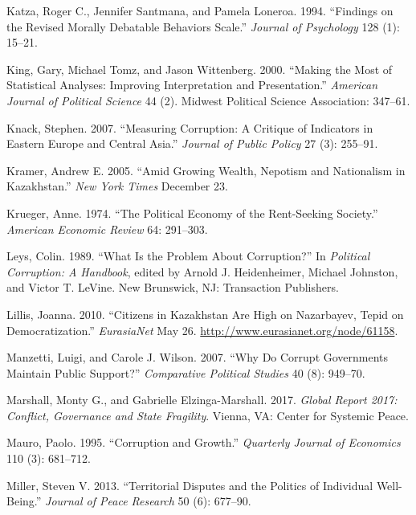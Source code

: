 \documentclass[11pt,]{article}
\begin{document}
\hypertarget{ref-katzaetal1994frmd}{}
Katza, Roger C., Jennifer Santmana, and Pamela Loneroa. 1994. ``Findings
on the Revised Morally Debatable Behaviors Scale.'' \emph{Journal of
Psychology} 128 (1): 15--21.

\hypertarget{ref-kingetal2000mmsa}{}
King, Gary, Michael Tomz, and Jason Wittenberg. 2000. ``Making the Most
of Statistical Analyses: Improving Interpretation and Presentation.''
\emph{American Journal of Political Science} 44 (2). Midwest Political
Science Association: 347--61.

\hypertarget{ref-knack2007mc}{}
Knack, Stephen. 2007. ``Measuring Corruption: A Critique of Indicators
in Eastern Europe and Central Asia.'' \emph{Journal of Public Policy} 27
(3): 255--91.

\hypertarget{ref-kramer2005agw}{}
Kramer, Andrew E. 2005. ``Amid Growing Wealth, Nepotism and Nationalism
in Kazakhstan.'' \emph{New York Times} December 23.

\hypertarget{ref-krueger1974pers}{}
Krueger, Anne. 1974. ``The Political Economy of the Rent-Seeking
Society.'' \emph{American Economic Review} 64: 291--303.

\hypertarget{ref-leys1989pch}{}
Leys, Colin. 1989. ``What Is the Problem About Corruption?'' In
\emph{Political Corruption: A Handbook}, edited by Arnold J.
Heidenheimer, Michael Johnston, and Victor T. LeVine. New Brunswick, NJ:
Transaction Publishers.

\hypertarget{ref-lillis2010ckh}{}
Lillis, Joanna. 2010. ``Citizens in Kazakhstan Are High on Nazarbayev,
Tepid on Democratization.'' \emph{EurasiaNet} May 26.
\url{http://www.eurasianet.org/node/61158}.

\hypertarget{ref-manzettiwilson2007wdcg}{}
Manzetti, Luigi, and Carole J. Wilson. 2007. ``Why Do Corrupt
Governments Maintain Public Support?'' \emph{Comparative Political
Studies} 40 (8): 949--70.

\hypertarget{ref-marshallmarshall2017gr}{}
Marshall, Monty G., and Gabrielle Elzinga-Marshall. 2017. \emph{Global
Report 2017: Conflict, Governance and State Fragility}. Vienna, VA:
Center for Systemic Peace.

\hypertarget{ref-mauro1995cg}{}
Mauro, Paolo. 1995. ``Corruption and Growth.'' \emph{Quarterly Journal
of Economics} 110 (3): 681--712.

\hypertarget{ref-miller2013tdpi}{}
Miller, Steven V. 2013. ``Territorial Disputes and the Politics of
Individual Well-Being.'' \emph{Journal of Peace Research} 50 (6):
677--90.
\end{document}
